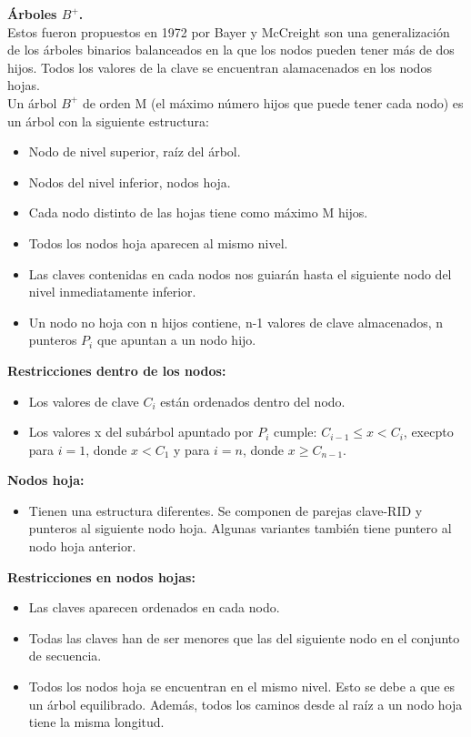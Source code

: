 \documentclass[a4paper,11pt]{article}
\begin{document}
\textbf{Árboles $B^+$.} \\

Estos fueron propuestos en 1972 por Bayer y McCreight son una generalización de los árboles binarios balanceados en la que los nodos pueden tener más de dos hijos. Todos los valores de la clave se encuentran alamacenados en los nodos hojas. \\

Un árbol $B^+$ de orden M (el máximo número hijos que puede tener cada nodo) es un árbol con la siguiente estructura:

\begin{itemize}
\item Nodo de nivel superior, raíz del árbol.
\item Nodos del nivel inferior, nodos hoja.
\item Cada nodo distinto de las hojas tiene como máximo M hijos.
\item Todos los nodos hoja aparecen al mismo nivel.
\item Las claves contenidas en cada nodos nos guiarán hasta el siguiente nodo del nivel inmediatamente inferior.
\item Un nodo no hoja con n hijos contiene, n-1 valores de clave almacenados, n punteros $P_i$ que apuntan a un nodo hijo.
\end{itemize}

\textbf{Restricciones dentro de los nodos:}

\begin{itemize}
\item Los valores de clave $C_i$ están ordenados dentro del nodo.
\item Los valores x del subárbol apuntado por $P_i$ cumple: $C_{i-1} \leq x < C_i$, execpto para $i=1$, donde $x < C_1$ y para $i=n$, donde $x \geq C_{n-1}$.
\end{itemize}

\textbf{Nodos hoja:}

\begin{itemize}
\item Tienen una estructura diferentes. Se componen de parejas clave-RID y punteros al siguiente nodo hoja. Algunas variantes también tiene puntero al nodo hoja anterior.
\end{itemize}

\textbf{Restricciones en nodos hojas:}

\begin{itemize}
\item Las claves aparecen ordenados en cada nodo.
\item Todas las claves han de ser menores que las del siguiente nodo en el conjunto de secuencia. 
\item Todos los nodos hoja se encuentran en el mismo nivel. Esto se debe a que es un árbol equilibrado. Además, todos los caminos desde al raíz a un nodo hoja tiene la misma longitud.
\end{itemize}
\end{document}
